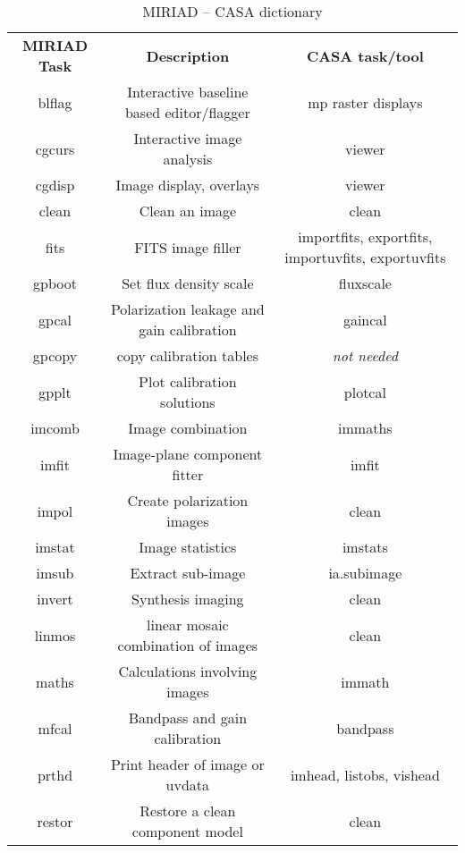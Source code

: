 \vspace{5mm}
\begin{table}[ht]
\caption[MIRIAD -- CASA dictionary]
        {\label{table:miriad}MIRIAD -- CASA dictionary}
\begin{center}
\begin{tabular}{|c|c|c|} \hline
{\bf MIRIAD Task} &  {\bf Description}     &  {\bf CASA task/tool}   \\
  blflag  &  Interactive baseline based editor/flagger  &  mp raster displays\\
  cgcurs  &  Interactive image analysis    &  viewer \\ 
  cgdisp  &  Image display, overlays       &  viewer  \\
  clean   &  Clean an image                &  clean   \\
  fits    &  FITS image filler             &  importfits, exportfits,
  importuvfits, exportuvfits \\  
  gpboot  &  Set flux density scale        &  fluxscale  \\
  gpcal   &  Polarization leakage and gain calibration  &  gaincal  \\
  gpcopy  &  copy calibration tables       &  {\it not needed} \\
  gpplt   &  Plot calibration solutions    &  plotcal  \\
  imcomb  &  Image combination             &  immaths   \\
  imfit   &  Image-plane component fitter  & imfit  \\
  impol   &  Create polarization images    &  clean   \\
  imstat  &  Image statistics              &  imstats  \\
  imsub   &  Extract sub-image             &  ia.subimage   \\
  invert  &  Synthesis imaging             &  clean  \\
  linmos  &  linear mosaic combination of images  &  clean  \\
  maths   &  Calculations involving images  &   immath \\ 
  mfcal   &  Bandpass and gain calibration  &  bandpass \\
  prthd   &  Print header of image or uvdata  &  imhead, listobs, vishead  \\
  restor  &  Restore a clean component model  &  clean \\

\end{tabular}
\end{center}
\end{table}
